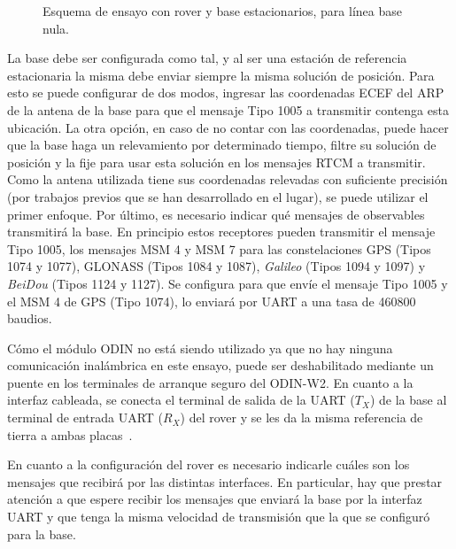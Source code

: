 \documentclass[a4paper,12pt,oneside,onecolumn,final,openright]{book}%
\begin{document}
\begin{figure}
\centering
{}
\centering
{}
\caption{Esquema de ensayo con rover y base estacionarios, para línea base nula.}
\label{fig:EnsayoZBL}
\end{figure}

	La base debe ser configurada como tal, y al ser una estación de referencia estacionaria la misma debe enviar siempre la misma solución de posición. Para esto se puede configurar de dos modos, ingresar las coordenadas ECEF del ARP de la antena de la base para que el mensaje Tipo 1005 a transmitir contenga esta ubicación. La otra opción, en caso de no contar con las coordenadas, puede hacer que la base haga un relevamiento por determinado tiempo, filtre su solución de posición y la fije para usar esta solución en los mensajes RTCM a transmitir. Como la antena utilizada tiene sus coordenadas relevadas con suficiente precisión (por trabajos previos que se han desarrollado en el lugar), se puede utilizar el primer enfoque. Por último, es necesario indicar qué mensajes de observables transmitirá la base. En principio estos receptores pueden transmitir el mensaje Tipo 1005, los mensajes MSM 4 y MSM 7 para las constelaciones GPS (Tipos 1074 y 1077), GLONASS (Tipos 1084 y 1087), \textit{Galileo} (Tipos 1094 y 1097) y \textit{BeiDou} (Tipos 1124 y 1127). Se configura para que envíe el mensaje Tipo 1005 y el MSM 4 de GPS (Tipo 1074), lo enviará por UART a una tasa de 460800 baudios.
	
	Cómo el módulo ODIN no está siendo utilizado ya que no hay ninguna comunicación inalámbrica en este ensayo, puede ser deshabilitado mediante un puente en los terminales de arranque seguro del ODIN-W2. En cuanto a la interfaz cableada, se conecta el terminal de salida de la UART ($T_X$) de la base al terminal de entrada UART ($R_X$) del rover y se les da la misma referencia de tierra a ambas placas~\cite{moving_base_AppN}.
	
	En cuanto a la configuración del rover es necesario indicarle cuáles son los mensajes que recibirá por las distintas interfaces. En particular, hay que prestar atención a que espere recibir los mensajes que enviará la base por la interfaz UART y que tenga la misma velocidad de transmisión que la que se configuró para la base.
\end{document}

